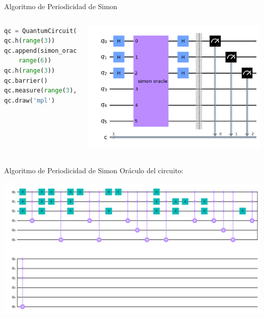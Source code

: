 \documentclass[10pt,compress]{beamer}
\begin{document}
\begin{frame}[fragile]{Algoritmo de Periodicidad de Simon}
\begin{columns}

\begin{lstlisting}[language=Python]
qc = QuantumCircuit(6,3)
qc.h(range(3))
qc.append(simon_oracle,
    range(6))
qc.h(range(3))
qc.barrier()
qc.measure(range(3),range(3))
qc.draw('mpl')
\end{lstlisting}

\begin{center}
\includegraphics[width=\hsize]{qc_simon}
\end{center}

\end{columns}

\end{frame}

\begin{frame}{Algoritmo de Periodicidad de Simon}
Oráculo del circuito:
\begin{center}
\includegraphics[height=0.8\vsize,width=\hsize]{simon_oracle}
\end{center}

\end{frame}
\end{document}
